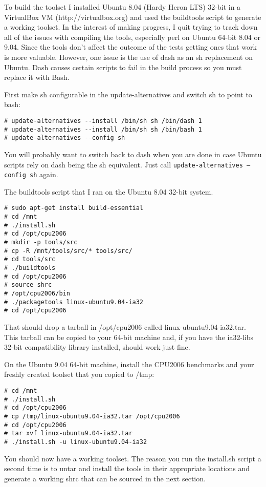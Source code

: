 \documentclass[12pt,twoside,a4paper]{article}
\begin{document}
To build the toolset I installed Ubuntu 8.04 (Hardy Heron LTS) 32-bit in a VirtualBox VM (http://virtualbox.org) and used the buildtools script to generate a working toolset. In the interest of making progress, I quit trying to track down all of the issues with compiling the tools, especially perl on Ubuntu 64-bit 8.04 or 9.04. Since the tools don't affect the outcome of the tests getting ones that work is more valuable. However, one issue is the use of dash as an sh replacement on Ubuntu. Dash causes certain scripts to fail in the build process so you must replace it with Bash.

First make sh configurable in the update-alternatives and switch sh to point to bash:
\begin{lstlisting}
# update-alternatives --install /bin/sh sh /bin/dash 1
# update-alternatives --install /bin/sh sh /bin/bash 1
# update-alternatives --config sh
\end{lstlisting}

You will probably want to switch back to dash when you are done in case Ubuntu scripts rely on dash being the sh equivalent. Just call \texttt{update-alternatives --config sh} again.

The buildtools script that I ran on the Ubuntu 8.04 32-bit system.
\begin{lstlisting}
# sudo apt-get install build-essential
# cd /mnt
# ./install.sh
# cd /opt/cpu2006
# mkdir -p tools/src
# cp -R /mnt/tools/src/* tools/src/
# cd tools/src
# ./buildtools
# cd /opt/cpu2006
# source shrc
# /opt/cpu2006/bin
# ./packagetools linux-ubuntu9.04-ia32
# cd /opt/cpu2006
\end{lstlisting}

That should drop a tarball in /opt/cpu2006 called linux-ubuntu9.04-ia32.tar. This tarball can be copied to your 64-bit machine and, if you have the ia32-libs 32-bit compatibility library installed, should work just fine.

On the Ubuntu 9.04 64-bit machine, install the CPU2006 benchmarks and your freshly created toolset that you copied to /tmp:
\begin{lstlisting}
# cd /mnt
# ./install.sh
# cd /opt/cpu2006
# cp /tmp/linux-ubuntu9.04-ia32.tar /opt/cpu2006
# cd /opt/cpu2006
# tar xvf linux-ubuntu9.04-ia32.tar
# ./install.sh -u linux-ubuntu9.04-ia32
\end{lstlisting}

You should now have a working toolset. The reason you run the install.sh script a second time is to untar and install the tools in their appropriate locations and generate a working shrc that can be sourced in the next section.
\end{document}
